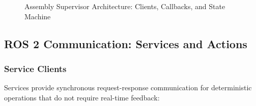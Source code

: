 \begin{figure}[H]
    \centering
    \caption{Assembly Supervisor Architecture: Clients, Callbacks, and State Machine}
    \label{fig:supervisor_arch}
\end{figure}

\subsection{ROS 2 Communication: Services and Actions}

\subsubsection{Service Clients}

Services provide synchronous request-response communication for deterministic operations that do not require real-time feedback:

